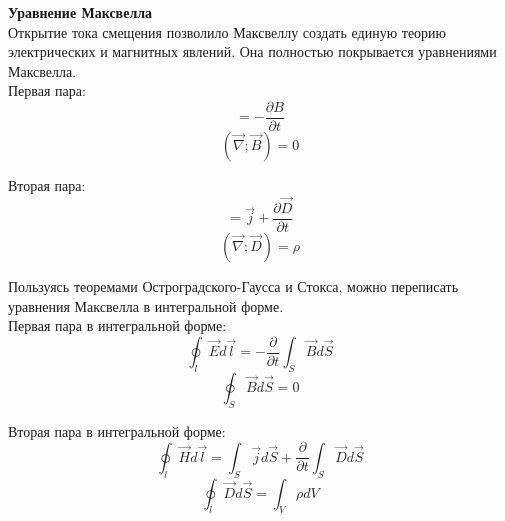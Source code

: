 \documentclass{article}
\begin{document}
	
	\textbf{Уравнение Максвелла}\\

	Открытие тока смещения позволило Максвеллу создать единую теорию электрических и магнитных явлений. Она полностью покрывается уравнениями Максвелла.\\

	Первая пара:
	\begin{equation}
		[\vec\nabla;\vec E] = -\frac{\partial B}{\partial t}
	\end{equation}
	\begin{equation}
		(\vec\nabla;\vec B) = 0
	\end{equation}

	Вторая пара:
	\begin{equation}
		[\vec\nabla;\vec H] = \vec j + \frac{\partial\vec D}{\partial t}
	\end{equation}
	\begin{equation}
		(\vec\nabla;\vec D) = \rho
	\end{equation}

	Пользуясь теоремами Остроградского-Гаусса и Стокса, можно переписать уравнения Максвелла в интегральной форме.\\

	Первая пара в интегральной форме:
	\begin{equation}
		\oint_l \vec E d\vec l = -\frac{\partial}{\partial t}\int_S \vec B d\vec S
	\end{equation}
	\begin{equation}
		\oint_S \vec B d\vec S = 0
	\end{equation}

	Вторая пара в интегральной форме:
	\begin{equation}
		\oint_l \vec H d\vec l = \int_S \vec j d\vec S + \frac{\partial}{\partial t} \int_S \vec D d\vec S
	\end{equation}
	\begin{equation}
		\oint_l \vec D d\vec S = \int_V \rho dV
	\end{equation}
\end{document}
